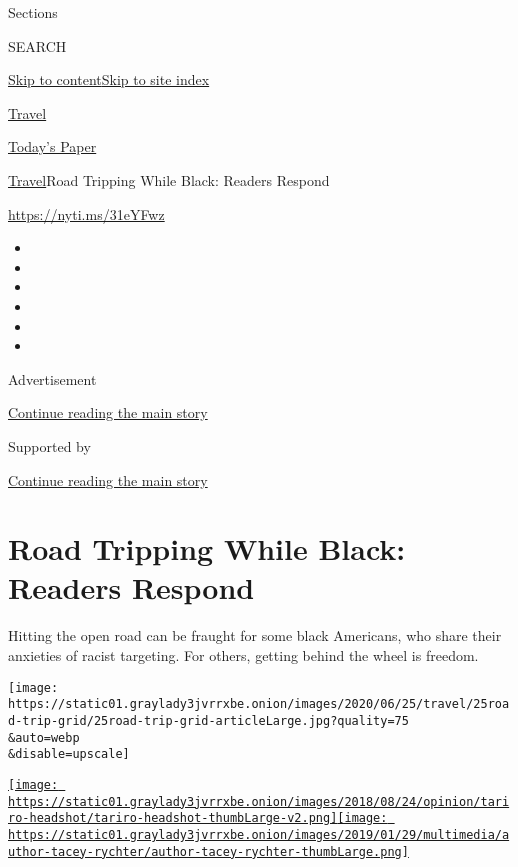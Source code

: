 Sections

SEARCH

\protect\hyperlink{site-content}{Skip to
content}\protect\hyperlink{site-index}{Skip to site index}

\href{https://www.nytimes3xbfgragh.onion/section/travel}{Travel}

\href{https://myaccount.nytimes3xbfgragh.onion/auth/login?response_type=cookie\&client_id=vi}{}

\href{https://www.nytimes3xbfgragh.onion/section/todayspaper}{Today's
Paper}

\href{/section/travel}{Travel}\textbar{}Road Tripping While Black:
Readers Respond

\url{https://nyti.ms/31eYFwz}

\begin{itemize}
\item
\item
\item
\item
\item
\item
\end{itemize}

Advertisement

\protect\hyperlink{after-top}{Continue reading the main story}

Supported by

\protect\hyperlink{after-sponsor}{Continue reading the main story}

\hypertarget{road-tripping-while-black-readers-respond}{%
\section{Road Tripping While Black: Readers
Respond}\label{road-tripping-while-black-readers-respond}}

Hitting the open road can be fraught for some black Americans, who share
their anxieties of racist targeting. For others, getting behind the
wheel is freedom.

\texttt{[image: https://static01.graylady3jvrrxbe.onion/images/2020/06/25/travel/25road-trip-grid/25road-trip-grid-articleLarge.jpg?quality=75\\\&auto=webp\\\&disable=upscale]}

\href{https://www.nytimes3xbfgragh.onion/by/tariro-mzezewa}{\texttt{[image: https://static01.graylady3jvrrxbe.onion/images/2018/08/24/opinion/tariro-headshot/tariro-headshot-thumbLarge-v2.png]}}\href{https://www.nytimes3xbfgragh.onion/by/tacey-rychter}{\texttt{[image: https://static01.graylady3jvrrxbe.onion/images/2019/01/29/multimedia/author-tacey-rychter/author-tacey-rychter-thumbLarge.png]}}

